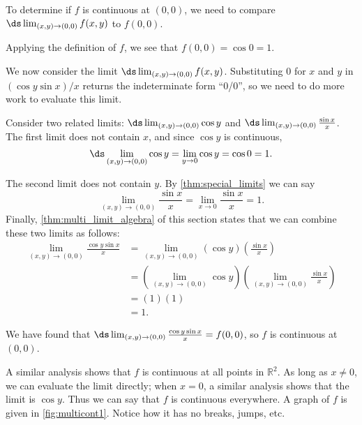 {To determine if $f$ is continuous at $(0,0)$, we need to compare $\ds\lim_{(x,y)\to (0,0)} f(x,y)$ to $f(0,0)$. 

Applying the definition of $f$, we see that $f(0,0) = \cos 0 = 1$. 

We now consider the limit $\ds \lim_{(x,y)\to (0,0)} f(x,y)$. Substituting $0$ for $x$ and $y$ in $(\cos y\sin x)/x$ returns the indeterminate form ``0/0'', so we need to do more work to evaluate this limit.

Consider two related limits: $\ds \lim_{(x,y)\to (0,0)} \cos y$ and $\ds \lim_{(x,y)\to(0,0)} \frac{\sin x}x$. The first limit does not contain $x$, and since $\cos y$ is continuous, $$\ds \lim_{(x,y)\to (0,0)} \cos y =\lim_{y\to 0} \cos y = \cos 0 = 1.$$

The second limit does not contain $y$. By \autoref{thm:special_limits} we can say
$$\lim_{(x,y)\to (0,0)} \frac{\sin x}{x} = \lim_{x\to 0} \frac{\sin x}{x} = 1.$$
Finally, \autoref{thm:multi_limit_algebra} of this section states that we can combine these two limits as follows:
\begin{align*}
\lim_{(x,y)\to (0,0)} \frac{\cos y\sin x}{x} &= \lim_{(x,y)\to (0,0)} (\cos y)\left(\frac{\sin x}{x}\right) \\ 
&=\left(\lim_{(x,y)\to (0,0)} \cos y\right)\left(\lim_{(x,y)\to (0,0)} \frac{\sin x}{x}\right) \\
  &= (1)(1)\\
	&=1.
\end{align*}

We have found that $\ds \lim_{(x,y)\to (0,0)} \frac{\cos y\sin x}{x} = f(0,0)$, so $f$ is continuous at $(0,0)$.

A similar analysis shows that $f$ is continuous at all points in $\mathbb{R}^2$. As long as $x\neq0$, we can evaluate the limit directly; when $x=0$, a similar analysis shows that the limit is $\cos y$. Thus we can say that $f$ is continuous everywhere. A graph of $f$ is given in \autoref{fig:multicont1}. Notice how it has no breaks, jumps, etc.
}

